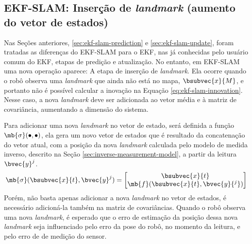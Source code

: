 \subsection{EKF-SLAM: Inserção de \textit{landmark} (aumento do vetor de estados)}
\label{sec:ekf-slam-landmark-insertion}
Nas Seções anteriores, \ref{sec:ekf-slam-prediction} e \ref{sec:ekf-slam-update}, foram tratadas as diferenças 
do EKF-SLAM para o EKF, nas já conhecidas pelo usuário comum do EKF, etapas de predição e atualização. No entanto, em EKF-SLAM uma nova operação aparece: A etapa de inserção de \textit{landmark}. Ela ocorre quando o robô observa uma \textit{landmark} que ainda não está no mapa, $\bsubvec{x}{M}$, e portanto não é possível calcular a inovação na Equação \ref{eq:ekf-slam-innovation}. Nesse caso, a nova \textit{landmark} deve ser adicionada ao vetor média e à matriz de covariância, aumentando a dimensão do sistema.

Para adicionar uma nova \textit{landmark} no vetor de estado, será definida 
a função $\mb{\sigma}(\bullet, \bullet)$, ela gera um novo vetor de estados 
que é resultado da concatenação do vetor atual, com a posição da nova 
\textit{landmark} calculada pelo modelo de medida inverso, descrito na Seção \ref{sec:inverse-measurement-model}, a partir da leitura $\bvec{y}^j$.
\begin{equation}
      \mb{\sigma}(\bsubvec{x}{t}, \bvec{y}^j) = \begin{bmatrix}
        \bsubvec{x}{t} \\
        \mb{f}(\bsubvec{x}{t}, \bvec{y}{^j})
      \end{bmatrix}
\end{equation}
Porém, não basta apenas adicionar a nova \textit{landmark} no vetor de estados, é necessário adicioná-la também na matriz de covariâncias. Quando 
o robô observa uma nova \textit{landmark}, é esperado que o erro de estimação 
da posição dessa nova \textit{landmark} seja influenciado pelo erro da 
pose do robô, no momento da leitura, e pelo erro de de medição do sensor. 

